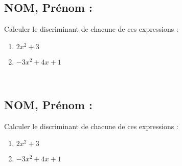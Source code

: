 \documentclass[a4paper,11pt,exos]{nsi} %
\begin{document}


\subsection*{NOM, Prénom : \dotfill} 

\maketitle

\begin{exercice}
    Calculer le discriminant de chacune de ces expressions :
    \begin{multicols}{2}
        \begin{enumerate}
            \item $2x^2+3$
        
            \item $-3x^2+4x+1$
        \end{enumerate}
    \end{multicols}
    
\end{exercice}

\\



\subsection*{NOM, Prénom : \dotfill} 


\maketitle


\begin{exercice}
    Calculer le discriminant de chacune de ces expressions :
    \begin{multicols}{2}
        \begin{enumerate}
            \item $2x^2+3$
        
            \item $-3x^2+4x+1$
        \end{enumerate}
    \end{multicols}
    
\end{exercice}
\end{document}
